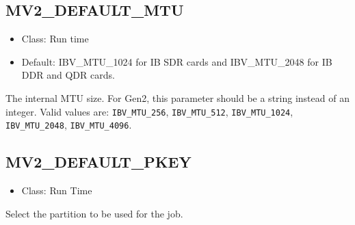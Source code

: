 \subsection{MV2\_DEFAULT\_MTU}
\label{def:nem-rdma-default-mtu}

\begin{itemize}
    \item Class: Run time

    \item Default: IBV\_MTU\_1024 for IB SDR cards and IBV\_MTU\_2048 for IB DDR and
		QDR cards.
\end{itemize}

The internal MTU size. For Gen2, this parameter should be a string instead
of an integer. Valid values are: \texttt{IBV\_MTU\_256}, \texttt{IBV\_MTU\_512},
\texttt{IBV\_MTU\_1024}, \texttt{IBV\_MTU\_2048}, \texttt{IBV\_MTU\_4096}.

\subsection{MV2\_DEFAULT\_PKEY}
\label{def:nem-mv2-default-pkey}
\begin{itemize}
		\item Class: Run Time
\end{itemize}

Select the partition to be used for the job.

%



%


